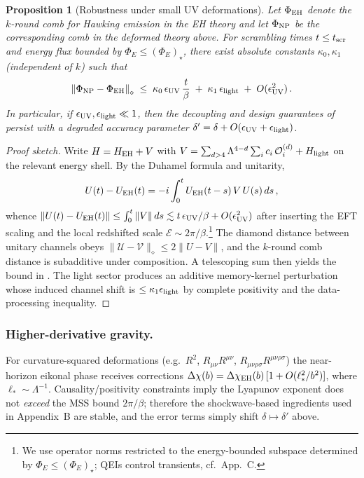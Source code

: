 \documentclass[11pt,a4paper]{article}
\newcommand{\normD}[1]{\left\lVert #1 \right\rVert_{\diamond}}
\newcommand{\Eflux}{\Phi_E}
\newcommand{\Ddiamond}[1]{\normD{#1}}
\theoremstyle{plain}
\newtheorem{proposition}[theorem]{Proposition}
\theoremstyle{definition}
\theoremstyle{remark}
\begin{document}
\begin{proposition}[Robustness under small UV deformations]\label{prop:robustness-uv}
Let $\Phi_{\rm EH}$ denote the $k$-round comb for Hawking emission in the EH theory and let $\Phi_{\rm NP}$ be the corresponding comb in the deformed theory above. For scrambling times $t\le t_{\rm scr}$ and energy flux bounded by $\Eflux\le (\Eflux)_\star$, there exist absolute constants $\kappa_0,\kappa_1$ (independent of $k$) such that
\begin{equation}
\Ddiamond{\Phi_{\rm NP}-\Phi_{\rm EH}} \;\le\; \kappa_0\,\epsilon_{\rm UV}\,\frac{t}{\beta}\;+\;\kappa_1\,\epsilon_{\rm light}\;+\;O(\epsilon_{\rm UV}^2)\,.
\end{equation}
In particular, if $\epsilon_{\rm UV},\epsilon_{\rm light}\ll 1$, then the decoupling and design guarantees of  persist with a degraded accuracy parameter $\delta'=\delta+O(\epsilon_{\rm UV}+\epsilon_{\rm light})$.
\end{proposition}

\begin{proof}[Proof sketch]
Write $H=H_{\rm EH}+V$ with $V=\sum_{d>4}\Lambda^{4-d}\sum_i c_i\,\mathcal{O}^{(d)}_i + H_{\rm light}$ on the relevant energy shell. By the Duhamel formula and unitarity,
\begin{equation}
U(t)-U_{\rm EH}(t)= -i\int_0^t U_{\rm EH}(t-s)\,V\,U(s)\,ds\,,
\end{equation}
whence $\|U(t)-U_{\rm EH}(t)\|\le \int_0^t \|V\|\,ds \lesssim t\,\epsilon_{\rm UV}/\beta + O(\epsilon_{\rm UV}^2)$ after inserting the EFT scaling and the local redshifted scale $\mathcal{E}\sim 2\pi/\beta$.\footnote{We use operator norms restricted to the energy-bounded subspace determined by $\Eflux\le (\Eflux)_\star$; QEIs control transients, cf.\ App.~C.} The diamond distance between unitary channels obeys $\|\mathcal{U}-\mathcal{V}\|_\diamond\le 2\|U-V\|$, and the $k$-round comb distance is subadditive under composition. A telescoping sum then yields the bound in . The light sector produces an additive memory-kernel perturbation whose induced channel shift is $\le \kappa_1\epsilon_{\rm light}$ by complete positivity and the data-processing inequality.
\end{proof}

\subsubsection{Higher-derivative gravity.} For curvature-squared deformations (e.g.\ $R^2$, $R_{\mu\nu}R^{\mu\nu}$, $R_{\mu\nu\rho\sigma}R^{\mu\nu\rho\sigma}$) the near-horizon eikonal phase receives corrections $\Delta\chi(b)=\Delta\chi_{\rm EH}(b)\,[1+O(\ell_\ast^2/b^2)]$, where $\ell_\ast\sim \Lambda^{-1}$. Causality/positivity constraints imply the Lyapunov exponent does not \emph{exceed} the MSS bound $2\pi/\beta$; therefore the shockwave-based ingredients used in Appendix~B are stable, and the error terms simply shift $\delta\mapsto\delta'$ above.
\end{document}
